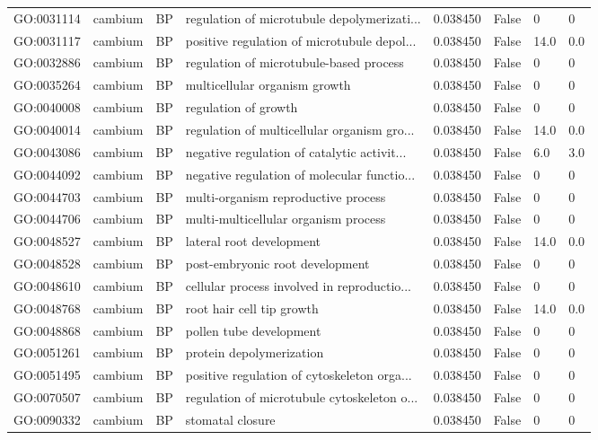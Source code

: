 \begin{longtable}{llllrl}
GO:0031114 & cambium & BP &   regulation of microtubule depolymerizati...  & 0.038450 &   False  & 0 & 0 \\
GO:0031117 & cambium & BP &   positive regulation of microtubule depol...  & 0.038450 &   False  & 14.0 & 0.0 \\ 
GO:0032886 & cambium & BP &   regulation of microtubule-based process  & 0.038450 &   False  & 0 & 0 \\
GO:0035264 & cambium & BP &   multicellular organism growth  & 0.038450 &   False  & 0 & 0 \\
GO:0040008 & cambium & BP &   regulation of growth  & 0.038450 &   False  & 0 & 0 \\
GO:0040014 & cambium & BP &   regulation of multicellular organism gro...  & 0.038450 &   False  & 14.0 & 0.0 \\ 
GO:0043086 & cambium & BP &   negative regulation of catalytic activit...  & 0.038450 &   False  & 6.0 & 3.0 \\ 
GO:0044092 & cambium & BP &   negative regulation of molecular functio...  & 0.038450 &   False  & 0 & 0 \\
GO:0044703 & cambium & BP &   multi-organism reproductive process  & 0.038450 &   False  & 0 & 0 \\
GO:0044706 & cambium & BP &   multi-multicellular organism process  & 0.038450 &   False  & 0 & 0 \\
GO:0048527 & cambium & BP &   lateral root development  & 0.038450 &   False  & 14.0 & 0.0 \\ 
GO:0048528 & cambium & BP &   post-embryonic root development  & 0.038450 &   False  & 0 & 0 \\
GO:0048610 & cambium & BP &   cellular process involved in reproductio...  & 0.038450 &   False  & 0 & 0 \\
GO:0048768 & cambium & BP &   root hair cell tip growth  & 0.038450 &   False  & 14.0 & 0.0 \\ 
GO:0048868 & cambium & BP &   pollen tube development  & 0.038450 &   False  & 0 & 0 \\
GO:0051261 & cambium & BP &   protein depolymerization  & 0.038450 &   False  & 0 & 0 \\
GO:0051495 & cambium & BP &   positive regulation of cytoskeleton orga...  & 0.038450 &   False  & 0 & 0 \\
GO:0070507 & cambium & BP &   regulation of microtubule cytoskeleton o...  & 0.038450 &   False  & 0 & 0 \\
GO:0090332 & cambium & BP &   stomatal closure  & 0.038450 &   False  & 0 & 0 \\

\end{longtable}
